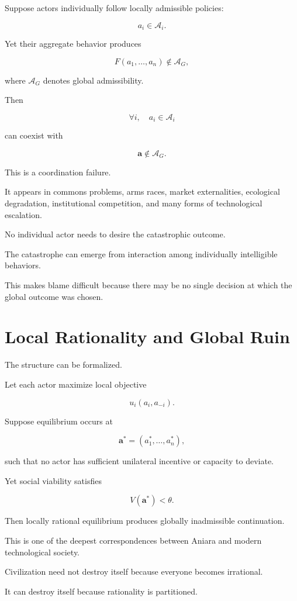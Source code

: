 \documentclass[11pt,oneside]{book}
\theoremstyle{definition}
\theoremstyle{remark}
\newcommand{\A}{\mathcal{A}}
\begin{document}
Suppose actors individually follow locally admissible policies:

\[
a_i\in\A_i.
\]

Yet their aggregate behavior produces

\[
F(a_1,\ldots,a_n)\notin\A_G,
\]

where \(\A_G\) denotes global admissibility.

Then

\[
\forall i,\quad a_i\in\A_i
\]

can coexist with

\[
\mathbf a\notin\A_G.
\]

This is a coordination failure.

It appears in commons problems, arms races, market externalities, ecological degradation, institutional competition, and many forms of technological escalation.

No individual actor needs to desire the catastrophic outcome.

The catastrophe can emerge from interaction among individually intelligible behaviors.

This makes blame difficult because there may be no single decision at which the global outcome was chosen.

\section{Local Rationality and Global Ruin}

The structure can be formalized.

Let each actor maximize local objective

\[
u_i(a_i,a_{-i}).
\]

Suppose equilibrium occurs at

\[
\mathbf a^\ast
=
(a_1^\ast,\ldots,a_n^\ast),
\]

such that no actor has sufficient unilateral incentive or capacity to deviate.

Yet social viability satisfies

\[
V(\mathbf a^\ast)<\theta.
\]

Then locally rational equilibrium produces globally inadmissible continuation.

This is one of the deepest correspondences between Aniara and modern technological society.

Civilization need not destroy itself because everyone becomes irrational.

It can destroy itself because rationality is partitioned.
\end{document}
